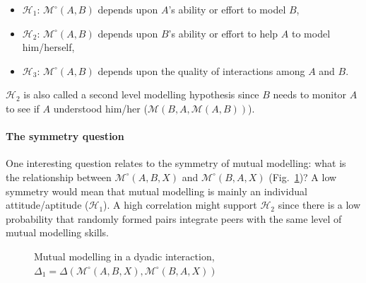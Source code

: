\documentclass[natbib]{svjour3}
\newcommand{\Model}[3]{{$\mathcal{M}^{\circ}(#1, #2, #3)$}}
\begin{document}
\begin{itemize}
    \item $\mathcal{H}_{1}$: $\mathcal{M}^{\circ}(A,B)$ depends upon $A$'s ability or effort
        to model $B$,
    
    \item $\mathcal{H}_{2}$: $\mathcal{M}^{\circ}(A,B)$ depends upon  $B$'s ability or
        effort to help $A$ to model him/herself,

    \item $\mathcal{H}_{3}$: $\mathcal{M}^{\circ}(A,B)$ depends upon the quality of
        interactions among $A$ and $B$.

\end{itemize}



$\mathcal{H}_{2}$ is also called a second level modelling hypothesis since $B$
needs to monitor $A$ to see if $A$ understood him/her
($\mathcal{M}(B,A,\mathcal{M}(A,B))$).

\paragraph{The symmetry question}

One interesting question relates to the symmetry of mutual modelling: what is
the relationship between \Model{A}{B}{X} and
\Model{B}{A}{X} (Fig.~\ref{mm_symmetry})? A low symmetry would mean that mutual modelling is mainly an
individual attitude/aptitude ($\mathcal{H}_{1}$). A high correlation might
support $\mathcal{H}_{2}$ since there is a low probability that randomly formed
pairs integrate peers with the same level of mutual modelling skills.

\begin{figure}[htb]
\centering


\caption{\small Mutual modelling in a dyadic interaction, $\Delta_1 =
    \Delta(\mathcal{M}^{\circ} (A,B,X),
\mathcal{M}^{\circ} (B,A,X))$}

\label{mm_symmetry}
\end{figure}
\end{document}
